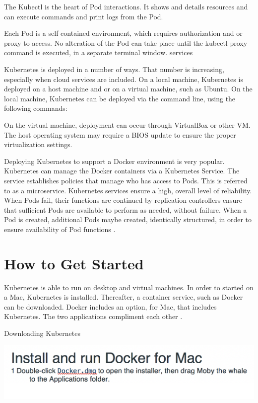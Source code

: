 \documentclass[12pt, letterpaper]{article}
\begin{document}
The Kubectl is the heart of Pod interactions.  It shows and details resources and can execute commands and print logs from the Pod.

Each Pod is a self contained environment, which requires authorization and or proxy to access.  No alteration of the Pod can take place until the kubectl proxy command is executed, in a separate terminal window.  
services 


Kubernetes is deployed in a number of ways.  That number is increasing, especially when cloud services are included.  On a local machine, Kubernetes is deployed on a host machine and or on a virtual machine, such as Ubuntu.  On the local machine, Kubernetes can be deployed via the command line, using the following commands:


On the virtual machine, deployment can occur through VirtualBox or other VM.  The host operating system may require a BIOS update to ensure the proper virtualization settings.  

Deploying Kubernetes to support a Docker environment is very popular.  Kubernetes can manage the Docker containers via a Kubernetes Service.  The service establishes policies that manage who has access to Pods.  This is referred to as a microservice.  Kubernetes services ensure a high, overall level of reliability.  When Pods fail, their functions are continued by replication controllers ensure that sufficient Pods are available to perform as needed, without failure.  When a Pod is created, additional Pods maybe created, identically structured, in order to ensure availability of Pod functions  \cite{hid-sp18-525-service}. 

\section *{How to Get Started}
\setlength{\parskip}{1.6em}

Kubernetes is able to run on desktop and virtual machines.  In order to started on a Mac, Kubernetes is installed.  Thereafter, a container service, such as Docker can be downloaded.  Docker includes an option, for Mac, that includes Kubernetes.  The two applications compliment each other  \cite{hid-sp18-525-service}. 

Downloading Kubernetes
\setlength{\parskip}{1.6em}


\includegraphics[width=1\textwidth, center]{Install Docker.png}
\end{document}
